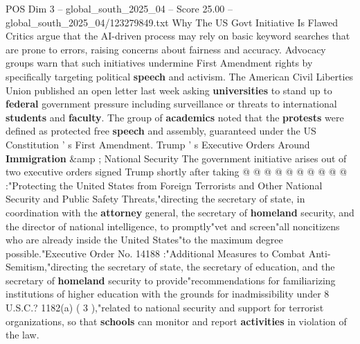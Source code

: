 \begin{textsample}{POS Dim 3 – global\_south\_2025\_04 – Score 25.00 – global\_south\_2025\_04/123279849.txt}
Why The US Govt Initiative Is Flawed Critics argue that the AI-driven process may rely on basic keyword searches that are prone to errors, raising concerns about fairness and accuracy.
Advocacy groups warn that such initiatives undermine First Amendment rights by specifically targeting political \textbf{speech} and activism.
The American Civil Liberties Union published an open letter last week asking \textbf{universities} to stand up to \textbf{federal} government pressure including surveillance or threats to international \textbf{students} and \textbf{faculty}.
The group of \textbf{academics} noted that the \textbf{protests} were defined as protected free \textbf{speech} and assembly, guaranteed under the US Constitution ' s First Amendment.
Trump ' s Executive Orders Around \textbf{Immigration} \&amp ; National Security The government initiative arises out of two executive orders signed Trump shortly after taking @ @ @ @ @ @ @ @ @ @ :"Protecting the United States from Foreign Terrorists and Other National Security and Public Safety Threats,"directing the secretary of state, in coordination with the \textbf{attorney} general, the secretary of \textbf{homeland} security, and the director of national intelligence, to promptly"vet and screen"all noncitizens who are already inside the United States"to the maximum degree possible."Executive Order No. 14188 :"Additional Measures to Combat Anti-Semitism,"directing the secretary of state, the secretary of education, and the secretary of \textbf{homeland} security to provide"recommendations for familiarizing institutions of higher education with the grounds for inadmissibility under 8 U.S.C.? 1182(a) ( 3 ),"related to national security and support for terrorist organizations, so that \textbf{schools} can monitor and report \textbf{activities} in violation of the law.

\end{textsample}
